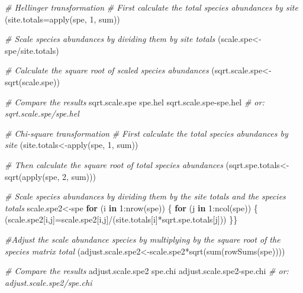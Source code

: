 \documentclass[
]{book}
\newenvironment{Shaded}{\begin{snugshade}}{\end{snugshade}}
\newcommand{\AttributeTok}[1]{\textcolor[rgb]{0.77,0.63,0.00}{#1}}
\newcommand{\CommentTok}[1]{\textcolor[rgb]{0.56,0.35,0.01}{\textit{#1}}}
\newcommand{\ControlFlowTok}[1]{\textcolor[rgb]{0.13,0.29,0.53}{\textbf{#1}}}
\newcommand{\DecValTok}[1]{\textcolor[rgb]{0.00,0.00,0.81}{#1}}
\newcommand{\FunctionTok}[1]{\textcolor[rgb]{0.00,0.00,0.00}{#1}}
\newcommand{\NormalTok}[1]{#1}
\newcommand{\OtherTok}[1]{\textcolor[rgb]{0.56,0.35,0.01}{#1}}
\newcommand{\SpecialCharTok}[1]{\textcolor[rgb]{0.00,0.00,0.00}{#1}}
\begin{document}
\begin{Shaded}
\begin{Highlighting}[]
\CommentTok{\# Hellinger transformation}
\CommentTok{\# First calculate the total species abundances by site}
\NormalTok{(}\AttributeTok{site.totals=}\FunctionTok{apply}\NormalTok{(spe, }\DecValTok{1}\NormalTok{, sum))}

\CommentTok{\# Scale species abundances by dividing them by site totals}
\NormalTok{(scale.spe}\OtherTok{\textless{}{-}}\NormalTok{spe}\SpecialCharTok{/}\NormalTok{site.totals)}

\CommentTok{\# Calculate the square root of scaled species abundances}
\NormalTok{(sqrt.scale.spe}\OtherTok{\textless{}{-}}\FunctionTok{sqrt}\NormalTok{(scale.spe))}

\CommentTok{\# Compare the results}
\NormalTok{sqrt.scale.spe}
\NormalTok{spe.hel}
\NormalTok{sqrt.scale.spe}\SpecialCharTok{{-}}\NormalTok{spe.hel }\CommentTok{\# or: sqrt.scale.spe/spe.hel}

\CommentTok{\# Chi{-}square transformation}
\CommentTok{\# First calculate the total species abundances by site}
\NormalTok{(site.totals}\OtherTok{\textless{}{-}}\FunctionTok{apply}\NormalTok{(spe, }\DecValTok{1}\NormalTok{, sum))}

\CommentTok{\# Then calculate the square root of total species abundances}
\NormalTok{(sqrt.spe.totals}\OtherTok{\textless{}{-}}\FunctionTok{sqrt}\NormalTok{(}\FunctionTok{apply}\NormalTok{(spe, }\DecValTok{2}\NormalTok{, sum)))}

\CommentTok{\# Scale species abundances by dividing them by the site totals and the species totals}
\NormalTok{scale.spe2}\OtherTok{\textless{}{-}}\NormalTok{spe}
\ControlFlowTok{for}\NormalTok{ (i }\ControlFlowTok{in} \DecValTok{1}\SpecialCharTok{:}\FunctionTok{nrow}\NormalTok{(spe)) \{}
  \ControlFlowTok{for}\NormalTok{ (j }\ControlFlowTok{in} \DecValTok{1}\SpecialCharTok{:}\FunctionTok{ncol}\NormalTok{(spe)) \{}
\NormalTok{   (scale.spe2[i,j]}\OtherTok{=}\NormalTok{scale.spe2[i,j]}\SpecialCharTok{/}\NormalTok{(site.totals[i]}\SpecialCharTok{*}\NormalTok{sqrt.spe.totals[j]))   \}\}}

\CommentTok{\#Adjust the scale abundance species by multiplying by the square root of the species matrix total                                         }
\NormalTok{(adjust.scale.spe2}\OtherTok{\textless{}{-}}\NormalTok{scale.spe2}\SpecialCharTok{*}\FunctionTok{sqrt}\NormalTok{(}\FunctionTok{sum}\NormalTok{(}\FunctionTok{rowSums}\NormalTok{(spe))))}

\CommentTok{\# Compare the results}
\NormalTok{adjust.scale.spe2}
\NormalTok{spe.chi}
\NormalTok{adjust.scale.spe2}\SpecialCharTok{{-}}\NormalTok{spe.chi }\CommentTok{\# or: adjust.scale.spe2/spe.chi}
\end{Highlighting}
\end{Shaded}
\end{document}
